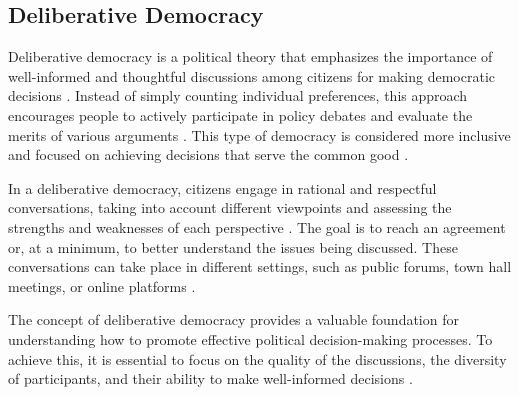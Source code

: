 \documentclass{IEEEtran}
\begin{document}
\subsection{Deliberative Democracy}

Deliberative democracy is a political theory that emphasizes the importance of well-informed and thoughtful discussions among citizens for making democratic decisions \cite{gutmann2004why, habermas1996between}. Instead of simply counting individual preferences, this approach encourages people to actively participate in policy debates and evaluate the merits of various arguments \cite{habermas1996between}. This type of democracy is considered more inclusive and focused on achieving decisions that serve the common good \cite{cohen1997deliberation}.

In a deliberative democracy, citizens engage in rational and respectful conversations, taking into account different viewpoints and assessing the strengths and weaknesses of each perspective \cite{mansbridge2012systemic}. The goal is to reach an agreement or, at a minimum, to better understand the issues being discussed. These conversations can take place in different settings, such as public forums, town hall meetings, or online platforms \cite{neblo2010who}.

The concept of deliberative democracy provides a valuable foundation for understanding how to promote effective political decision-making processes. To achieve this, it is essential to focus on the quality of the discussions, the diversity of participants, and their ability to make well-informed decisions \cite{dryzek2000deliberative}.

\end{document}
